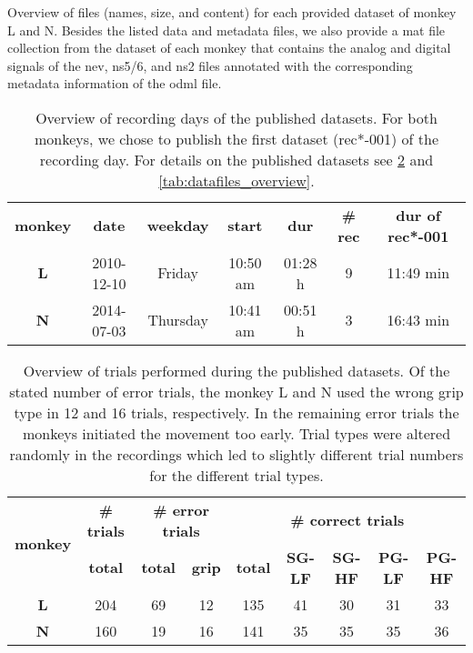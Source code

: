 {\begin{table}
\caption[Overview of files (names, size, and content) for each provided dataset of monkey L and N]{Overview of files (names, size, and content) for each provided dataset of monkey L and N. Besides the listed data and metadata files, we also provide a mat file collection from the dataset of each monkey that contains the analog and digital signals of the nev, ns5/6, and ns2 files annotated with the corresponding metadata information of the odml file.}
\label{tab:datafiles_overview}
\end{table}

\begin{table}
\begin{tabular}{|c|c|c|c|c|c|c|}
\hline 
\multirow{2}{*}{\textbf{monkey}} & \multirow{2}{*}{\textbf{date}} & \multirow{2}{*}{\textbf{weekday}} & \multirow{2}{*}{\textbf{start}} & \multirow{2}{*}{\textbf{dur}} & \multirow{2}{*}{\textbf{\# rec}} & \multirow{2}{*}{\textbf{dur of rec{*}-001}}\tabularnewline
 &  &  &  &  &  & \tabularnewline
\hline 
\hline 
\textbf{L} & 2010-12-10 & Friday & 10:50 am & 01:28 h & 9 & 11:49 min\tabularnewline
\hline 
\textbf{N} & 2014-07-03 & Thursday & 10:41 am & 00:51 h & 3 & 16:43 min\tabularnewline
\hline 
\end{tabular}
\caption[Overview of recording days of the published datasets]{Overview of recording days of the published datasets. For both monkeys, we chose to publish the first dataset (rec{*}-001) of the recording day. For details on the published datasets
see \cref{tab:datafiles_trials} and \cref{tab:datafiles_overview}.}
\label{tab:datasets_recday}
\end{table}


\begin{table}
\begin{tabular}{|c|c|c|c|c|c|c|c|c|}
\hline 
\multirow{2}{*}{\textbf{monkey}} & \textbf{\# trials} & \multicolumn{2}{c|}{\textbf{\# error trials}} & \multicolumn{5}{c|}{\textbf{\# correct trials }}\tabularnewline
\cline{2-9} 
 & 
\textbf{total}
 & 
\textbf{total}
 & 
\textbf{grip}
 & 
\textbf{total}
 & 
\textbf{SG-LF}
 & 
\textbf{SG-HF}
 & 
\textbf{PG-LF}
 & 
\textbf{PG-HF}
\tabularnewline
\hline 
\hline 
\textbf{L} & 204 & 69 & 12 & 135 & 41 & 30 & 31 & 33\tabularnewline
\hline 
\textbf{N} & 160 & 19 & 16 & 141 & 35 & 35 & 35 & 36\tabularnewline
\hline 
\end{tabular}
\caption[Overview of trials performed during the published datasets]{Overview of trials performed during the published datasets. Of the stated number of error trials, the monkey L and N used the wrong grip type in 12 and 16 trials, respectively. In the remaining error trials the monkeys initiated the movement too
early. Trial types were altered randomly in the recordings which led to slightly different trial numbers for the different trial types.}
\label{tab:datafiles_trials}
\end{table}

}
